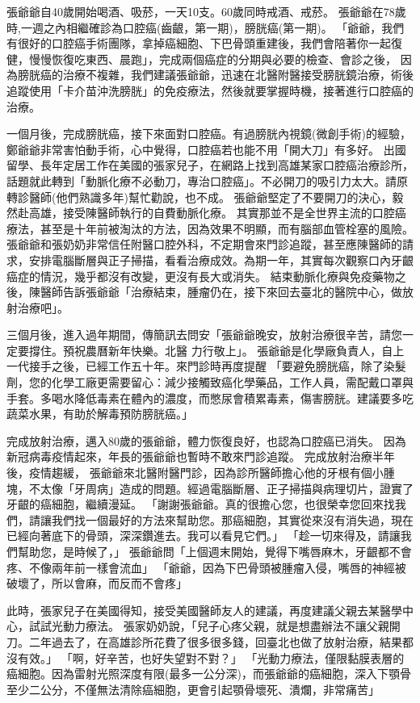 \documentclass[12pt, a4paper]{article}
\begin{document}
張爺爺自40歲開始喝酒、吸菸，一天10支。60歲同時戒酒、戒菸。
張爺爺在78歲時,一週之內相繼確診為口腔癌(齒齦，第一期)，膀胱癌(第一期)。
「爺爺，我們有很好的口腔癌手術團隊，拿掉癌細胞、下巴骨頭重建後，我們會陪著你一起復健，慢慢恢復吃東西、晨跑」，完成兩個癌症的分期與必要的檢查、會診之後，
因為膀胱癌的治療不複雜，我們建議張爺爺，迅速在北醫附醫接受膀胱鏡治療，術後追蹤使用「卡介苗沖洗膀胱」的免疫療法，然後就要掌握時機，接著進行口腔癌的治療。

一個月後，完成膀胱癌，接下來面對口腔癌。有過膀胱內視鏡(微創手術)的經驗，鄭爺爺非常害怕動手術，心中覺得，口腔癌若也能不用「開大刀」有多好。
出國留學、長年定居工作在美國的張家兒子，在網路上找到高雄某家口腔癌治療診所，話題就此轉到「動脈化療不必動刀，專治口腔癌」。不必開刀的吸引力太大。請原轉診醫師(他們熟識多年)幫忙勸說，也不成。
張爺爺堅定了不要開刀的決心，毅然赴高雄，接受陳醫師執行的自費動脈化療。
其實那並不是全世界主流的口腔癌療法，甚至是十年前被淘汰的方法，因為效果不明顯，而有腦部血管栓塞的風險。
張爺爺和張奶奶非常信任附醫口腔外科，不定期會來門診追蹤，甚至應陳醫師的請求，安排電腦斷層與正子掃描，看看治療成效。為期一年，其實每次觀察口內牙齦癌症的情況，幾乎都沒有改變，更沒有長大或消失。
結束動脈化療與免疫藥物之後，陳醫師告訴張爺爺「治療結束，腫瘤仍在，接下來回去臺北的醫院中心，做放射治療吧」。

三個月後，進入過年期間，傳簡訊去問安「張爺爺晚安，放射治療很辛苦，請您一定要撐住。預祝農曆新年快樂。北醫 力行敬上」。
張爺爺是化學廠負責人，自上一代接手之後，已經工作五十年。來門診時再度提醒 「要避免膀胱癌，除了染髮劑，您的化學工廠更需要留心：減少接觸致癌化學藥品，工作人員，需配戴口罩與手套。多喝水降低毒素在體內的濃度，而憋尿會積累毒素，傷害膀胱。建議要多吃蔬菜水果，有助於解毒預防膀胱癌。」

完成放射治療，邁入80歲的張爺爺，體力恢復良好，也認為口腔癌已消失。
因為新冠病毒疫情起來，年長的張爺爺也暫時不敢來門診追蹤。
完成放射治療半年後，疫情趨緩，
張爺爺來北醫附醫門診，因為診所醫師擔心他的牙根有個小腫塊，不太像「牙周病」造成的問題。經過電腦斷層、正子掃描與病理切片，證實了牙齦的癌細胞，繼續漫延。
「謝謝張爺爺。真的很擔心您，也很榮幸您回來找我們，請讓我們找一個最好的方法來幫助您。那癌細胞，其實從來沒有消失過，現在已經向著底下的骨頭，深深鑽進去。我可以看見它們。」
「趁一切來得及，請讓我們幫助您，是時候了，」
張爺爺問「上個週末開始，覺得下嘴唇麻木，牙齦都不會疼、不像兩年前一樣會流血」
「爺爺，因為下巴骨頭被腫瘤入侵，嘴唇的神經被破壞了，所以會麻，而反而不會疼」

此時，張家兒子在美國得知，接受美國醫師友人的建議，再度建議父親去某醫學中心，試試光動力療法。
張家奶奶說，「兒子心疼父親，就是想盡辦法不讓父親開刀。二年過去了，在高雄診所花費了很多很多錢，回臺北也做了放射治療，結果都沒有效。」
「啊，好辛苦，也好失望對不對？」
「光動力療法，僅限黏膜表層的癌細胞。因為雷射光照深度有限(最多一公分深)，而張爺爺的癌細胞，深入下顎骨至少二公分，不僅無法清除癌細胞，更會引起顎骨壞死、潰爛，非常痛苦」
\end{document}
